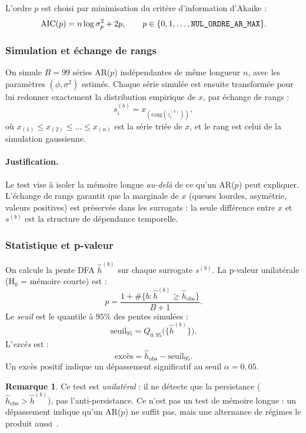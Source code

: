 \documentclass[11pt,a4paper]{article}
\theoremstyle{definition}
\newtheorem{remarque}{Remarque}
\newcommand{\code}[1]{\texttt{\detokenize{#1}}}
\begin{document}
L'ordre $p$ est choisi par minimisation du critère d'information d'Akaike :
\[
  \mathrm{AIC}(p) = n \log \sigma_p^2 + 2p, \qquad p \in \{0, 1, \dots, \code{NUL_ORDRE_AR_MAX}\}.
\]

\subsubsection{Simulation et échange de rangs}

On simule $B = 99$ séries AR($p$) indépendantes de même longueur $n$, avec les
paramètres $(\phi, \sigma^2)$ estimés. Chaque série simulée est ensuite transformée
pour lui redonner exactement la distribution empirique de $x$, par échange de
rangs :
\[
  s^{(b)}_i = x_{(\mathrm{rang}(z^{(b)}_i))},
\]
où $x_{(1)} \leq x_{(2)} \leq \dots \leq x_{(n)}$ est la série triée de $x$, et le
rang est celui de la simulation gaussienne.

\paragraph{Justification.} Le test vise à isoler la mémoire longue \emph{au-delà}
de ce qu'un AR($p$) peut expliquer. L'échange de rangs garantit que la marginale
de $x$ (queues lourdes, asymétrie, valeurs positives) est préservée dans les
surrogats : la seule différence entre $x$ et $s^{(b)}$ est la structure de
dépendance temporelle.

\subsubsection{Statistique et p-valeur}

On calcule la pente DFA $\hat h^{(b)}$ sur chaque surrogate $s^{(b)}$. La p-valeur
unilatérale (H$_0$ = mémoire courte) est :
\begin{equation}
  p = \frac{1 + \#\{b : \hat h^{(b)} \geq \hat h_{\mathrm{obs}}\}}{B + 1}.
  \label{eq:p-valeur-nul}
\end{equation}
Le \emph{seuil} est le quantile à $95\%$ des pentes simulées :
\[
  \mathrm{seuil}_{95} = Q_{0{,}95}\bigl(\{\hat h^{(b)}\}\bigr).
\]
L'\emph{excès} est :
\[
  \mathrm{excès} = \hat h_{\mathrm{obs}} - \mathrm{seuil}_{95}.
\]
Un excès positif indique un dépassement significatif au seuil $\alpha = 0{,}05$.

\begin{remarque}
Ce test est \emph{unilatéral} : il ne détecte que la persistance
($\hat h_{\mathrm{obs}} > \hat h^{(b)}$), pas l'anti-persistance. Ce n'est pas un
test de mémoire longue : un dépassement indique qu'un AR($p$) ne suffit pas, mais
une alternance de régimes le produit aussi~\cite{diebold2001}.
\end{remarque}
\end{document}
